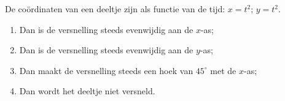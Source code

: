 
\begin{exercise}



De co\"ordinaten van een deeltje zijn als functie van de tijd:
$x=t^2$; $y=t^2$.
\begin{enumerate}
\item Dan is de versnelling steeds evenwijdig aan de $x$-as;
\item Dan is de versnelling steeds evenwijdig aan de $y$-as;
\item Dan maakt de versnelling steeds een hoek van $45^\circ$ met de $x$-as;
\item Dan wordt het deeltje niet versneld.
\end{enumerate}

\end{exercise}

